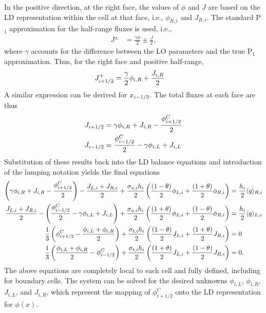 In the positive direction, at the right face, the
values of $\phi$ and $J$ are based on the LD representation within the cell at that
face, i.e., $\phi_{R,i}$ and $J_{R,i}$.  The standard P$_1$ approximation for the
half-range fluxes is used\cite{stacy}, i.e.,
\begin{align}
    J^{\pm} &= \frac{\gamma \phi}{2} \pm \frac{J}{2},
\end{align}
where $\gamma$ accounts for the difference between the LO parameters and the true
P$_1$ approximation. Thus, for the right face and positive half-range,
\begin{align}
    J_{{i+1/2}}^+ &= \frac{\gamma}{2}\phi_{i,R} + \frac{J_{i,R}}{2} 
\end{align}
A similar expression can be derived for ${x_{i-1/2}}$.  The total fluxes at each face are
thus
\begin{align}
    J_{i+1/2} &= \gamma\phi_{i,R} + J_{i,R} - \frac{\phi_{{i+1/2}}^C}{2} \\
    J_{i-1/2} &= \frac{\phi_{i-1/2}^C}{2} - \gamma \phi_{i,L} + J_{i,L}
\end{align}
Substitution of these results back into the LD balance equations and introduction of the
lumping notation yields the final equations 
\begin{align}\label{eq:update1}
    \left(\gamma\phi_{i,R} + J_{i,R} - \frac{\phi_{{i+1/2}}^C}{2} \right) - \frac{J_{L,i} + J_{R,i}}{2} + \frac{\sigma_{a,i} h_i}{2} \left(
    \frac{(1-\theta)}{2} \phi_{L,i} +
    \frac{(1+\theta)}{2}\phi_{R,i}\right) &= \frac{h_i}{2} \langle q \rangle_{R,i} \\
    \frac{J_{L,i} + J_{R,i}}{2} -\left(\frac{\phi_{i-1/2}^C}{2} - \gamma \phi_{i,L} +
    J_{i,L}\right) + \frac{\sigma_{a,i} h_i}{2} \left(
    \frac{(1+\theta)}{2} \phi_{L,i} +
    \frac{(1-\theta)}{2}\phi_{R,i}\right) &= \frac{h_i}{2} \langle q \rangle_{L,i} 
    \\
    \frac{1}{3}\left(\phi_{i+1/2}^C - \frac{\phi_{i,L} + \phi_{i,R}}{2}\right) +
    \frac{\sigma_{t,i} h_i}{2}\left( \frac{(1-\theta)}{2} J_{L,i} +
    \frac{(1+\theta)}{2}J_{R,i}\right)    &= 0 \\
    \frac{1}{3}\left(\frac{\phi_{i,L} + \phi_{i,R}}{2} - \phi^C_{i-1/2} \right) +
    \frac{\sigma_{t,i} h_i}{2} \left( \frac{(1+\theta)}{2} J_{L,i} +
    \frac{(1-\theta)}{2}J_{R,i}\right) &= 0 . \label{eq:update2}
\end{align}
The above equations are completely local to each cell and fully defined, including for
boundary cells.  The system can be solved for the desired unknowns
$\phi_{i,L}$, $\phi_{i,R}$, $J_{i,L}$, and $J_{i,R}$, which represent the mapping of
$\phi_{i+1/2}^C$ onto the LD representation for $\phi(x)$.


